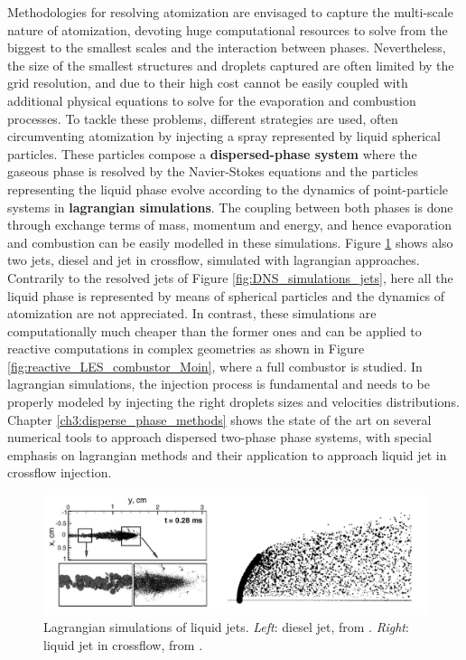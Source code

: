 Methodologies for resolving atomization are envisaged to capture the multi-scale nature of atomization, devoting huge computational resources to solve from the biggest to the smallest scales and the interaction between phases. Nevertheless, the size of the smallest structures and droplets captured are often limited by the grid resolution, and due to their high cost cannot be easily coupled with additional physical equations to solve for the evaporation and combustion processes. To tackle these problems, different strategies are used, often circumventing atomization by injecting a spray represented by liquid spherical particles. These particles compose a \textbf{dispersed-phase system} where the gaseous phase is resolved by the Navier-Stokes equations and the particles representing the liquid phase evolve according to the dynamics of point-particle systems in \textbf{lagrangian simulations}. The coupling between both phases is done through exchange terms of mass, momentum and energy, and hence evaporation and combustion can be easily modelled in these simulations. Figure \ref{fig:lagrangian_simulations_jets} shows also two jets, diesel and jet in crossflow, simulated with lagrangian approaches. Contrarily to the resolved jets of Figure \ref{fig:DNS_simulations_jets}, here all the liquid phase is represented by means of spherical particles and the dynamics of atomization are not appreciated. In contrast, these simulations are computationally much cheaper than the former ones and can be applied to reactive computations in complex geometries as shown in Figure \ref{fig:reactive_LES_combustor_Moin}, where a full combustor is studied. In lagrangian simulations, the injection process is fundamental and needs to be properly modeled by injecting the right droplets sizes and velocities distributions. Chapter \ref{ch3:disperse_phase_methods} shows the state of the art on several numerical tools to approach dispersed two-phase phase systems, with special emphasis on lagrangian methods and their application to approach liquid jet in crossflow injection.

\begin{figure}[h!]
	\centering
   \includegraphics[scale=0.5]{./part0_intro/jets_lagrangian_simulations}
	\caption[Lagrangian simulations of liquid jets.]{Lagrangian simulations of liquid jets. \textsl{Left}: diesel jet, from  . \textsl{Right}: liquid jet in crossflow, from .}
	\label{fig:lagrangian_simulations_jets}
\end{figure}

